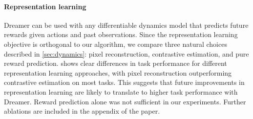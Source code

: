 \paragraph{Representation learning}

Dreamer can be used with any differentiable dynamics model that predicts future rewards given actions and past observations. Since the representation learning objective is orthogonal to our algorithm, we compare three natural choices described in \cref{sec:dynamics}: pixel reconstruction, contrastive estimation, and pure reward prediction.  shows clear differences in task performance for different representation learning approaches, with pixel reconstruction outperforming contrastive estimation on most tasks. This suggests that future improvements in representation learning are likely to translate to higher task performance with Dreamer. Reward prediction alone was not sufficient in our experiments. Further ablations are included in the appendix of the paper.
